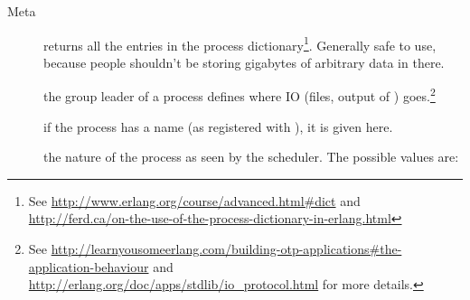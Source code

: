 \documentclass[11pt, oneside]{book}   	%
\begin{document}
\begin{description*}
	\item[Meta] \hfill
		\begin{description}		
			\item[] returns all the entries in the process dictionary\footnote{See \href{http://www.erlang.org/course/advanced.html\#dict}{http://www.erlang.org/course/advanced.html\#dict} and \href{http://ferd.ca/on-the-use-of-the-process-dictionary-in-erlang.html}{http://ferd.ca/on-the-use-of-the-process-dictionary-in-erlang.html}}. Generally safe to use, because people shouldn't be storing gigabytes of arbitrary data in there.
			
			\item[] the group leader of a process defines where IO (files, output of ) goes.\footnote{See \href{http://learnyousomeerlang.com/building-otp-applications\#the-application-behaviour}{http://learnyousomeerlang.com/building-otp-applications\#the-application-behaviour} and \href{http://erlang.org/doc/apps/stdlib/io\_protocol.html}{http://erlang.org/doc/apps/stdlib/io\_protocol.html} for more details.}
			
			\item[] if the process has a name (as registered with ), it is given here.
			
			\item[] the nature of the process as seen by the scheduler. The possible values are:
			

\end{description}
\end{description*}
\end{document}
